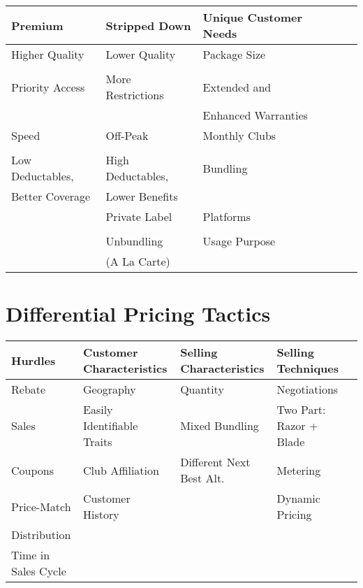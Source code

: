\documentclass[11pt, oneside]{article}   	%
\begin{document}
\begin{table}[ht]
\centering
\begin{tabular}{lllll}
  Premium 		\hspace{1in}	& Stripped Down	\hspace{0.9in}	& Unique Customer Needs			\\
  \hline
 Higher Quality			& Lower Quality		& Package Size				\\
 \\
\hline
Priority Access			& More Restrictions 		& Extended and  			\\
 					&					& Enhanced Warranties \\
\hline
Speed				& Off-Peak 			& Monthly Clubs 			\\
 					&  \\
\hline
Low Deductables,		& High Deductables,	& Bundling 			 	\\
Better Coverage 		&Lower Benefits		&  \\
   \hline
					& Private Label			& Platforms			 	\\
					&					& \\
   \hline
					& Unbundling			& Usage Purpose			 	\\
					& (A La Carte)				&\\
   \hline
\end{tabular}
\end{table}




 \section{Differential Pricing Tactics}
 
\begin{table}[ht]
\centering
\begin{tabular}{lllll}
Hurdles			 	& Customer Characteristics 	& Selling Characteristics	&Selling Techniques \\ 
 \hline
 Rebate				& Geography				& Quantity 				& Negotiations \\ 
Sales				& Easily Identifiable Traits 	& Mixed Bundling   			& Two Part: Razor + Blade \\ 
Coupons				& Club Affiliation 			& Different Next Best Alt. 		& Metering  \\ 
Price-Match 	& Customer History 			&  					 	& Dynamic Pricing \\ 
Distribution			& \\
Time in Sales Cycle \\
   \hline
\end{tabular}
\end{table}
\end{document}
